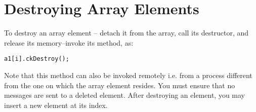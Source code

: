 \section{Destroying Array Elements}

To destroy an array element -- detach it from the array,
call its destructor, and release its memory--invoke its 
 method, as:

\begin{alltt}
a1[i].ckDestroy();
\end{alltt}

Note that this method can also be invoked remotely i.e. from 
a process different from the one on which the array element resides.
You must ensure that no messages are sent to a deleted element. 
After destroying an element, you may insert a new element at
its index. 
